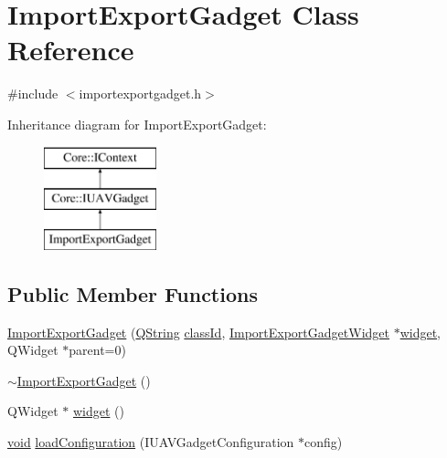 \hypertarget{class_import_export_gadget}{\section{\-Import\-Export\-Gadget \-Class \-Reference}
\label{class_import_export_gadget}
}


{\ttfamily \#include $<$importexportgadget.\-h$>$}

\-Inheritance diagram for \-Import\-Export\-Gadget\-:\begin{figure}[H]
\begin{center}
\leavevmode
\includegraphics[height=3.000000cm]{class_import_export_gadget}
\end{center}
\end{figure}
\subsection*{\-Public \-Member \-Functions}
\begin{DoxyCompactItemize}
\item 
\hyperlink{group__importexportplugin_ga449e9c18b4cda73ccd909194aa3485e5}{\-Import\-Export\-Gadget} (\hyperlink{group___u_a_v_objects_plugin_gab9d252f49c333c94a72f97ce3105a32d}{\-Q\-String} \hyperlink{group___core_plugin_ga3878fde66a57220608960bcc3fbeef2c}{class\-Id}, \hyperlink{class_import_export_gadget_widget}{\-Import\-Export\-Gadget\-Widget} $\ast$\hyperlink{class_import_export_gadget_a048a83f292ca28210ab659bed378f33b}{widget}, \-Q\-Widget $\ast$parent=0)
\item 
\hyperlink{group__importexportplugin_ga43425e89a61490abd203a67eb51a61e0}{$\sim$\-Import\-Export\-Gadget} ()
\item 
\-Q\-Widget $\ast$ \hyperlink{class_import_export_gadget_a048a83f292ca28210ab659bed378f33b}{widget} ()
\item 
\hyperlink{group___u_a_v_objects_plugin_ga444cf2ff3f0ecbe028adce838d373f5c}{void} \hyperlink{group__importexportplugin_gaffb56b3fb88f123af21ac597a514345a}{load\-Configuration} (\-I\-U\-A\-V\-Gadget\-Configuration $\ast$config)
\end{DoxyCompactItemize}


